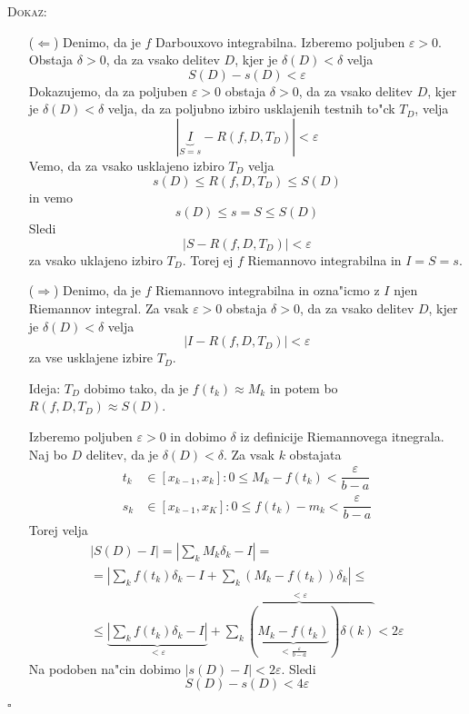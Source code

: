 \textsc{Dokaz:}
\begin{itemize}
	\item[($\Leftarrow$)] Denimo, da je $f$ Darbouxovo integrabilna. Izberemo poljuben $\varepsilon > 0$. Obstaja $\delta > 0$, da za vsako delitev $D$, kjer je $\delta(D) < \delta$ velja
	\begin{equation*}
	S(D) - s(D) < \varepsilon
	\end{equation*}
	Dokazujemo, da za poljuben $\varepsilon > 0$ obstaja $\delta > 0$, da za vsako delitev $D$, kjer je $\delta(D) < \delta$ velja, da za poljubno izbiro usklajenih testnih to"ck $T_D$, velja
	\begin{equation*}
	|\underbrace{I}_{S = s} - R(f, D, T_D)| < \varepsilon
	\end{equation*}
	Vemo, da za vsako usklajeno izbiro $T_D$ velja
	\begin{equation*}
	s(D) \leq R(f, D, T_D) \leq S(D)
	\end{equation*}
	in vemo
	\begin{equation*}
	s(D) \leq s = S \leq S(D)
	\end{equation*}
	Sledi
	\begin{equation*}
	|S - R(f, D, T_D)| < \varepsilon
	\end{equation*}
	za vsako uklajeno izbiro $T_D$. Torej ej $f$ Riemannovo integrabilna in $I = S = s$.
	
	\item[($\Rightarrow$)] Denimo, da je $f$ Riemannovo integrabilna in ozna"icmo z $I$ njen Riemannov integral. Za vsak $\varepsilon > 0$ obstaja $\delta > 0$, da za vsako delitev $D$, kjer je $\delta(D) < \delta$ velja
	\begin{equation*}
	|I - R(f, D, T_D)| < \varepsilon
	\end{equation*}
	za vse usklajene izbire $T_D$.
	
	Ideja: $T_D$ dobimo tako, da je $f(t_k) \approx M_k$ in potem bo $R(f, D, T_D) \approx S(D)$.
	
	Izberemo poljuben $\varepsilon > 0$ in dobimo $\delta$ iz definicije Riemannovega itnegrala. Naj bo $D$ delitev, da je $\delta(D) < \delta$. Za vsak $k$ obstajata
	\begin{align*}
	t_k &\in [x_{k-1}, x_k]: 0 \leq M_k - f(t_k) < \dfrac{\varepsilon}{b-a} \\
	s_k &\in [x_{k-1}, x_K]: 0 \leq f(t_k) - m_k < \dfrac{\varepsilon}{b-a}
	\end{align*}
	Torej velja
	\begin{multline*}
	|S(D) - I| = \left| \sum_k M_k \delta_k - I \right| = \\
	= \left| \sum_k f(t_k)\delta_k - I + \sum_k(M_k - f(t_k))\delta_k \right| \leq \\
	\leq \underbrace{\left| \sum_k f(t_k)\delta_k - I \right|}_{< \varepsilon} + \overbrace{\sum_k (\underbrace{M_k - f(t_k)}_{< \frac{\varepsilon}{b-a}})\delta(k)}^{< \varepsilon} < 2 \varepsilon
	\end{multline*}
	Na podoben na"cin dobimo $|s(D) - I| < 2 \varepsilon$. Sledi
	\begin{equation*}
	S(D) - s(D) < 4 \varepsilon
	\end{equation*}
\end{itemize}
\hfill $\square$

